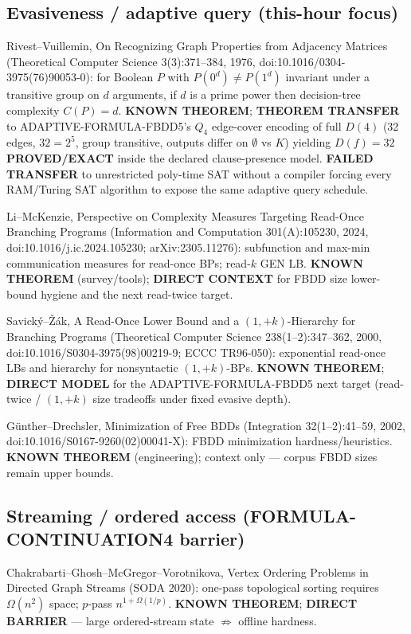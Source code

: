 \documentclass[11pt]{article}
\begin{document}
\subsection*{Evasiveness / adaptive query (this-hour focus)}
Rivest--Vuillemin, On Recognizing Graph Properties from Adjacency Matrices
(Theoretical Computer Science 3(3):371--384, 1976, doi:10.1016/0304-3975(76)90053-0):
for Boolean $P$ with $P(0^d)\neq P(1^d)$ invariant under a transitive group on $d$ arguments,
if $d$ is a prime power then decision-tree complexity $C(P)=d$.
\textbf{KNOWN THEOREM}; \textbf{THEOREM TRANSFER} to ADAPTIVE-FORMULA-FBDD5's $Q_4$ edge-cover
encoding of full $D(4)$ (32 edges, $32=2^5$, group transitive, outputs differ on $\emptyset$ vs $K$)
yielding $D(f)=32$ \textbf{PROVED/EXACT} inside the declared clause-presence model.
\textbf{FAILED TRANSFER} to unrestricted poly-time SAT without a compiler forcing every
RAM/Turing SAT algorithm to expose the same adaptive query schedule.

Li--McKenzie, Perspective on Complexity Measures Targeting Read-Once Branching Programs
(Information and Computation 301(A):105230, 2024, doi:10.1016/j.ic.2024.105230; arXiv:2305.11276):
subfunction and max-min communication measures for read-once BPs; read-$k$ GEN LB.
\textbf{KNOWN THEOREM} (survey/tools); \textbf{DIRECT CONTEXT} for FBDD size lower-bound hygiene
and the next read-twice target.

Savick\'y--\v{Z}\'ak, A Read-Once Lower Bound and a $(1,+k)$-Hierarchy for Branching Programs
(Theoretical Computer Science 238(1--2):347--362, 2000, doi:10.1016/S0304-3975(98)00219-9;
ECCC TR96-050): exponential read-once LBs and hierarchy for nonsyntactic $(1,+k)$-BPs.
\textbf{KNOWN THEOREM}; \textbf{DIRECT MODEL} for the ADAPTIVE-FORMULA-FBDD5 next target
(read-twice / $(1,+k)$ size tradeoffs under fixed evasive depth).

G\"unther--Drechsler, Minimization of Free BDDs
(Integration 32(1--2):41--59, 2002, doi:10.1016/S0167-9260(02)00041-X):
FBDD minimization hardness/heuristics.
\textbf{KNOWN THEOREM} (engineering); context only --- corpus FBDD sizes remain upper bounds.

\subsection*{Streaming / ordered access (FORMULA-CONTINUATION4 barrier)}
Chakrabarti--Ghosh--McGregor--Vorotnikova, Vertex Ordering Problems in Directed Graph Streams
(SODA 2020): one-pass topological sorting requires $\Omega(n^2)$ space; $p$-pass
$n^{1+\Omega(1/p)}$.
\textbf{KNOWN THEOREM}; \textbf{DIRECT BARRIER} --- large ordered-stream state $\not\Rightarrow$ offline hardness.
\end{document}
